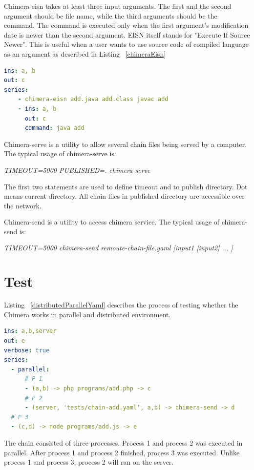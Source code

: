 \documentclass[conference]{IEEEtran}
\begin{document}
Chimera-eisn takes at least three input arguments. The first and the second argument should
be file name, while the third arguments should be the command. The command is 
executed only when the first argument's modification date is newer than the second 
argument. EISN itself stands for "Execute If Source Newer". This is useful when a user
wants to use source code of compiled language as an argument as described in Listing ~\ref{chimeraEisn}

\begin{lstlisting}[caption=Chimera-eisn usage example, label=chimeraEisn, language=yaml, basicstyle=\small, breaklines=true]
ins: a, b
out: c
series:
    - chimera-eisn add.java add.class javac add
    - ins: a, b
      out: c
      command: java add
\end{lstlisting}

Chimera-serve is a utility to allow several chain files being served by a computer.
The typical usage of chimera-serve is:

{\it TIMEOUT=5000 PUBLISHED=. chimera-serve}

The first two statements are used to define timeout and to publish directory. Dot means
current directory. All chain files in published directory are accessible over the network.

Chimera-send is a utility to access chimera service.
The typical usage of chimera-send is: 

{\it TIMEOUT=5000 chimera-send remoute-chain-file.yaml [input1 [input2] ... ]}


\section{Test}

Listing ~\ref{distributedParallelYaml} describes the process of testing whether the Chimera works
in parallel and distributed environment.

\begin{lstlisting}[caption=Distributed and Parallel YAML-chain Scenario, label=distributedParallelYaml, language=yaml, basicstyle=\small, breaklines=true]
ins: a,b,server
out: e
verbose: true
series:
  - parallel:
      # P 1
      - (a,b) -> php programs/add.php -> c
      # P 2
      - (server, 'tests/chain-add.yaml', a,b) -> chimera-send -> d
  # P 3
  - (c,d) -> node programs/add.js -> e
\end{lstlisting}

The chain consisted of three processes. Process 1 and process 2 was executed in parallel.
After process 1 and process 2 finished, process 3 was executed. Unlike process 1 and
process 3, process 2 will ran on the server.
\end{document}
